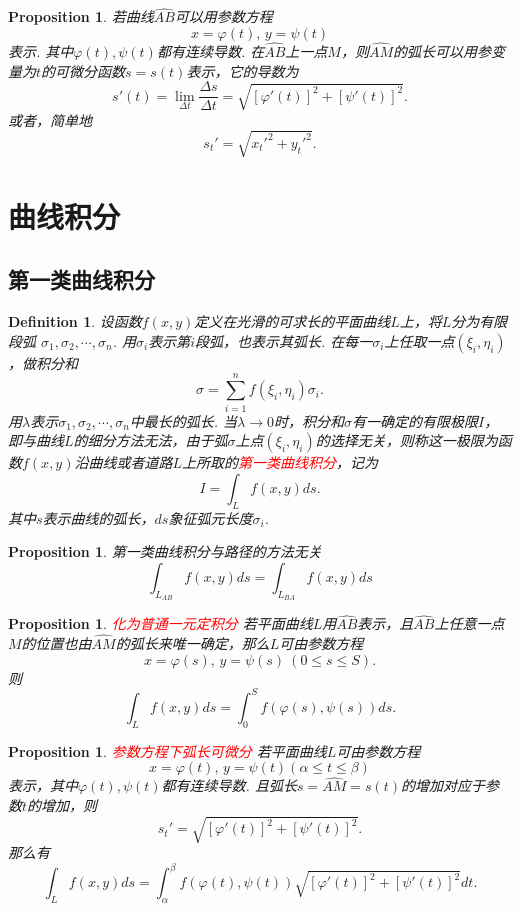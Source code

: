 \documentclass{article}
\newtheorem{proposition}[theorem]{Proposition}
\newtheorem{definition}[theorem]{Definition}
\newcommand{\redt}[1]{\textcolor{red}{#1}}
\begin{document}
\begin{proposition}
\rm 若曲线$\widehat{AB}$可以用参数方程
$$
x = \varphi(t), \, y = \psi(t) 
$$
表示. 其中$\varphi(t),\psi(t)$都有连续导数. 在$\widehat{AB}$上一点$M$，则$\widehat{AM}$的弧长可以用参变量为$t$的可微分函数$s = s(t)$表示，它的导数为
$$
s'(t) = \lim\limits_{\Delta t}\frac{\Delta s}{\Delta t} = \sqrt{[\varphi'(t)]^2+[\psi'(t)]^2}.
$$
或者，简单地
$$
s_t' = \sqrt{x_t'^2 + y_t'^2}. 
$$
\end{proposition}

\newpage
\section{曲线积分}

\subsection{第一类曲线积分}
\begin{definition}
\rm 设函数$f(x,y)$定义在光滑的可求长的平面曲线$L$上，将$L$分为有限段弧
$\sigma_1,\sigma_2,\cdots,\sigma_n$. 用$\sigma_i$表示第$i$段弧，也表示其弧长. 在每一$\sigma_i$上任取一点$(\xi_i,\eta_i)$，做积分和
$$
\sigma = \sum\limits_{i = 1}^n f(\xi_i,\eta_i)\sigma_i.
$$
用$\lambda$表示$\sigma_1,\sigma_2,\cdots,\sigma_n$中最长的弧长. 当$\lambda \to 0$时，积分和$\sigma$有一确定的有限极限$I$，即与曲线$L$的细分方法无法，由于弧$\sigma$上点$(\xi_i,\eta_i)$的选择无关，则称这一极限为函数$f(x,y)$沿曲线或者道路$L$上所取的\redt{第一类曲线积分}，记为
$$
I = \int_L f(x,y)ds. 
$$
其中$s$表示曲线的弧长，$ds$象征弧元长度$\sigma_i$.
\end{definition}

\begin{proposition}
\rm 第一类曲线积分与路径的方法无关
$$
\int_{L_{AB}} f(x,y)ds = \int_{L_{BA}} f(x,y)ds
$$
\end{proposition}

\begin{proposition}
\rm \redt{化为普通一元定积分} 若平面曲线$L$用$\widehat{AB}$表示，且$\widehat{AB}$上任意一点$M$的位置也由$\widehat{AM}$的弧长来唯一确定，那么$L$可由参数方程
$$
x = \varphi(s), \, y = \psi(s) ~ (0 \leq s \leq S).
$$
则
$$
\int_L f(x,y)ds = \int_{0}^S f(\varphi(s),\psi(s))ds.
$$
\end{proposition}

\begin{proposition}
\rm \redt{参数方程下弧长可微分} 若平面曲线$L$可由参数方程
$$
x = \varphi(t), \, y = \psi(t) (\alpha \leq t \leq \beta)
$$
表示，其中$\varphi(t),\psi(t)$都有连续导数. 且弧长$s = \widehat{AM} = s(t)$的增加对应于参数$t$的增加，则
$$
s_t' = \sqrt{[\varphi'(t)]^2+[\psi'(t)]^2}.
$$
那么有
$$
\int_L f(x,y)ds = \int_\alpha^\beta f(\varphi(t),\psi(t))\sqrt{[\varphi'(t)]^2+[\psi'(t)]^2}dt. 
$$
\end{proposition}
\end{document}
